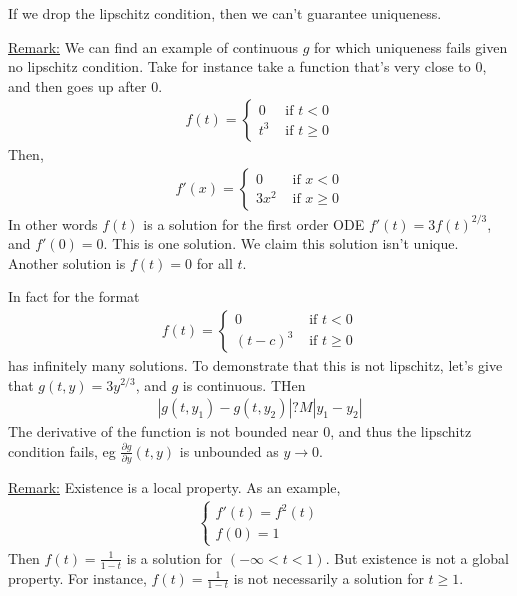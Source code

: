 \documentclass{article}
\newcommand*{\txt}[1]{\text{ #1 }}%
\begin{document}
If we drop the lipschitz condition, then we can't guarantee uniqueness.

\underline{Remark:} We can find an example of continuous $g$ for which uniqueness fails given no lipschitz condition. Take for instance take a function that's very close to 0, and then goes up after 0. \begin{align*}
    f(t)=\begin{cases}
        0 & \txt{if}t<0\\
        t^3 & \txt{if}t\geq 0
    \end{cases}
\end{align*}
Then, \begin{align*}
    f'(x)=\begin{cases}
        0 & \txt{if}x<0\\
        3x^2 & \txt{if}x\geq 0
    \end{cases}
\end{align*}
In other words $f(t)$ is a solution for the first order ODE $f'(t)=3f(t)^{2/3}$, and $f'(0)=0$. This is one solution. We claim this solution isn't unique. Another solution is $f(t)=0$ for all $t$.

In fact for the format \begin{align*}
    f(t)=\begin{cases}
        0 & \txt{if}t<0\\
        (t-c)^3 & \txt{if}t\geq 0
    \end{cases}
\end{align*} has infinitely many solutions. To demonstrate that this is not lipschitz, let's give that $g(t,y)=3y^{2/3}$, and $g$ is continuous. THen \begin{align*}
    |g(t,y_1)-g(t,y_2)|?M|y_1-y_2|
\end{align*} The derivative of the function is not bounded near 0, and thus the lipschitz condition fails, eg $\frac{\partial g}{\partial y}(t,y)$ is unbounded as $y\to 0$.

\underline{Remark:} Existence is a local property. As an example, \begin{align*}
    \begin{cases}
        f'(t)=f^2(t) \\
        f(0)=1
    \end{cases}
\end{align*} Then $f(t)=\frac{1}{1-t}$ is a solution for $(-\infty<t<1)$. But existence is not a global property. For instance, $f(t)=\frac{1}{1-t}$ is not necessarily a solution for $t\geq 1$.
\end{document}
